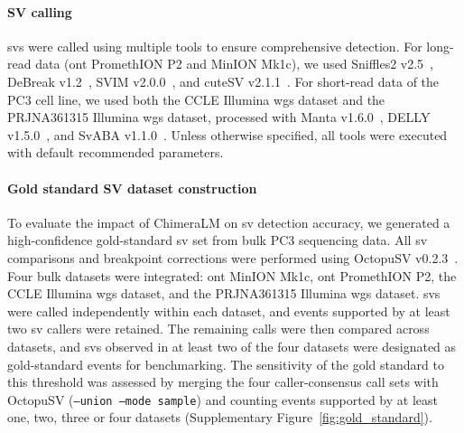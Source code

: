 \documentclass[pdflatex,lineno]{sn-jnl}%
\newif\ifrevisedtext
\newcommand{\chg}[1]{\ifrevisedtext\textcolor{revcolor}{#1}\else#1\fi}
\begin{document}
\paragraph{SV calling}
\glspl{sv} were called using multiple tools to ensure comprehensive detection.
For long-read data (\gls{ont} PromethION P2 and MinION Mk1c), we used \chg{Sniffles2} v2.5~\cite{Sedlazeck2018, Smolka2024}, DeBreak v1.2~\cite{chen2023deciphering}, SVIM v2.0.0~\cite{heller2019svim}, and cuteSV v2.1.1~\cite{jiang2020longreadbased}.
For short-read data of the PC3 cell line, we used both the CCLE Illumina \gls{wgs} dataset and the PRJNA361315 Illumina \gls{wgs} dataset, processed with Manta v1.6.0~\cite{chen2016manta}, DELLY v1.5.0~\cite{rausch2012delly}, and SvABA v1.1.0~\cite{wala2018svaba}.
Unless otherwise specified, all tools were executed with default recommended parameters.

\paragraph{Gold standard SV dataset construction}
To evaluate the impact of ChimeraLM on \gls{sv} detection accuracy, we generated a high-confidence gold-standard \gls{sv} set from bulk PC3 sequencing data.
All \gls{sv} comparisons and breakpoint corrections were performed using OctopuSV v0.2.3~\cite{guo2025octopusv}.
Four bulk datasets were integrated: \gls{ont} MinION Mk1c, \gls{ont} PromethION P2, the CCLE Illumina \gls{wgs} dataset, and the PRJNA361315 Illumina \gls{wgs} dataset.
\glspl{sv} were called independently within each dataset, and events supported by at least two \gls{sv} callers were retained.
The remaining calls were then compared across datasets, and \glspl{sv} observed in at least two of the four datasets were designated as gold-standard events for benchmarking.
\chg{The sensitivity of the gold standard to this threshold was assessed by merging the four caller-consensus call sets with OctopuSV (\texttt{--union --mode sample}) and counting events supported by at least one, two, three or four datasets (Supplementary Figure~\ref{fig:gold_standard}).}
\end{document}
